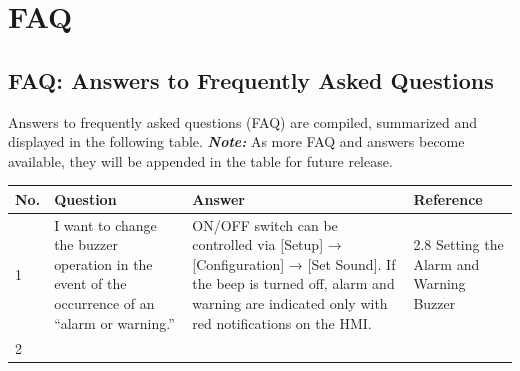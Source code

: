 %
\chapter{FAQ}
\label{appdxa-faq} 

\section{FAQ: Answers to Frequently Asked Questions} 

Answers to frequently asked questions (FAQ) are compiled, summarized and
displayed in the following table. \textbf{\emph{Note:}} As more FAQ and
answers become available, they will be appended in the table for future
release.

\begin{longtable}[]{@{}|l|l|l|l|@{}}
\toprule
\begin{minipage}[b]{0.08\columnwidth}\raggedright
No.\strut
\end{minipage} & \begin{minipage}[b]{0.30\columnwidth}\raggedright
Question\strut
\end{minipage} & \begin{minipage}[b]{0.33\columnwidth}\raggedright
Answer\strut
\end{minipage} & \begin{minipage}[b]{0.17\columnwidth}\raggedright
Reference\strut
\end{minipage}\tabularnewline
\midrule
\endhead
 \begin{minipage}[t]{0.08\columnwidth}\raggedright
1\strut
\end{minipage} & \begin{minipage}[t]{0.30\columnwidth}\raggedright
I want to change the buzzer operation in the event of the occurrence of
an ``alarm or warning.''\strut
\end{minipage} & \begin{minipage}[t]{0.33\columnwidth}\raggedright
ON/OFF switch can be controlled via {[}Setup{]} → {[}Configuration{]} →
{[}Set Sound{]}. If the beep is turned off, alarm and warning are
indicated only with red notifications on the HMI.\strut
\end{minipage} & \begin{minipage}[t]{0.17\columnwidth}\raggedright
2.8 Setting the Alarm and Warning Buzzer\strut
\end{minipage}\tabularnewline
 \begin{minipage}[t]{0.08\columnwidth}\raggedright
2\strut
\end{minipage} & \begin{minipage}[t]{0.30\columnwidth}\raggedright

\end{minipage}
\end{longtable}
